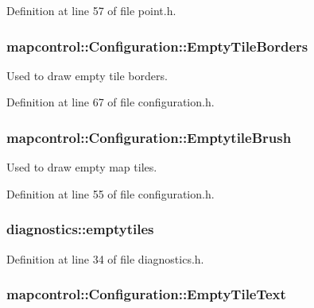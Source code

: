 Definition at line 57 of file point.\-h.

\hypertarget{group___o_p_map_widget_gae8db48d6cb03fedba7aa82d206dc82eb}{
\subsubsection[{Empty\-Tile\-Borders}]{\setlength{\rightskip}{0pt plus 5cm}mapcontrol\-::\-Configuration\-::\-Empty\-Tile\-Borders}}\label{group___o_p_map_widget_gae8db48d6cb03fedba7aa82d206dc82eb}


Used to draw empty tile borders. 



Definition at line 67 of file configuration.\-h.

\hypertarget{group___o_p_map_widget_gad6bf957803f87dacf49bbff6998c72b6}{
\subsubsection[{Emptytile\-Brush}]{\setlength{\rightskip}{0pt plus 5cm}mapcontrol\-::\-Configuration\-::\-Emptytile\-Brush}}\label{group___o_p_map_widget_gad6bf957803f87dacf49bbff6998c72b6}


Used to draw empty map tiles. 



Definition at line 55 of file configuration.\-h.

\hypertarget{group___o_p_map_widget_ga34fe3ec60c45212857e46367009f0729}{
\subsubsection[{emptytiles}]{ diagnostics\-::emptytiles}}\label{group___o_p_map_widget_ga34fe3ec60c45212857e46367009f0729}


Definition at line 34 of file diagnostics.\-h.

\hypertarget{group___o_p_map_widget_ga3cee2f55adac9ad6424d5ea36a1fec54}{
\subsubsection[{Empty\-Tile\-Text}]{\setlength{\rightskip}{0pt plus 5cm}mapcontrol\-::\-Configuration\-::\-Empty\-Tile\-Text}}\label{group___o_p_map_widget_ga3cee2f55adac9ad6424d5ea36a1fec54}


